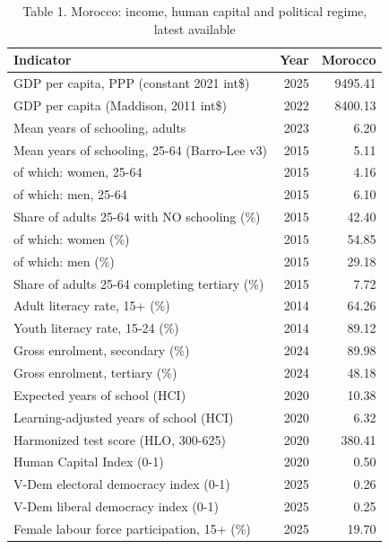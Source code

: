 \begin{table}
\caption{Table 1. Morocco: income, human capital and political regime, latest available}
\label{tab:T1_morocco_factsheet}
\begin{tabular}{lrr}
\toprule
Indicator & Year & Morocco \\
\midrule
GDP per capita, PPP (constant 2021 int\$) & 2025 & 9495.41 \\
GDP per capita (Maddison, 2011 int\$) & 2022 & 8400.13 \\
Mean years of schooling, adults & 2023 & 6.20 \\
Mean years of schooling, 25-64 (Barro-Lee v3) & 2015 & 5.11 \\
  of which: women, 25-64 & 2015 & 4.16 \\
  of which: men, 25-64 & 2015 & 6.10 \\
Share of adults 25-64 with NO schooling (\%) & 2015 & 42.40 \\
  of which: women (\%) & 2015 & 54.85 \\
  of which: men (\%) & 2015 & 29.18 \\
Share of adults 25-64 completing tertiary (\%) & 2015 & 7.72 \\
Adult literacy rate, 15+ (\%) & 2014 & 64.26 \\
Youth literacy rate, 15-24 (\%) & 2014 & 89.12 \\
Gross enrolment, secondary (\%) & 2024 & 89.98 \\
Gross enrolment, tertiary (\%) & 2024 & 48.18 \\
Expected years of school (HCI) & 2020 & 10.38 \\
Learning-adjusted years of school (HCI) & 2020 & 6.32 \\
Harmonized test score (HLO, 300-625) & 2020 & 380.41 \\
Human Capital Index (0-1) & 2020 & 0.50 \\
V-Dem electoral democracy index (0-1) & 2025 & 0.26 \\
V-Dem liberal democracy index (0-1) & 2025 & 0.25 \\
Female labour force participation, 15+ (\%) & 2025 & 19.70 \\
\bottomrule
\end{tabular}
\end{table}
